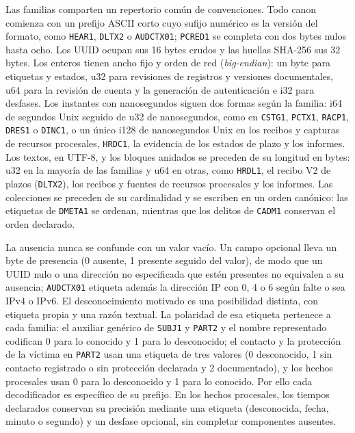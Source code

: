Las familias comparten un repertorio común de convenciones. Todo canon comienza con un prefijo ASCII corto cuyo sufijo numérico es la versión del formato, como \texttt{HEAR1}, \texttt{DLTX2} o \texttt{AUDCTX01}; \texttt{PCRED1} se completa con dos bytes nulos hasta ocho. Los UUID ocupan sus 16 bytes crudos y las huellas SHA-256 sus 32 bytes. Los enteros tienen ancho fijo y orden de red (\emph{big-endian}): un byte para etiquetas y estados, u32 para revisiones de registros y versiones documentales, u64 para la revisión de cuenta y la generación de autenticación e i32 para desfases. Los instantes con nanosegundos siguen dos formas según la familia: i64 de segundos Unix seguido de u32 de nanosegundos, como en \texttt{CSTG1}, \texttt{PCTX1}, \texttt{RACP1}, \texttt{DRES1} o \texttt{DINC1}, o un único i128 de nanosegundos Unix en los recibos y capturas de recursos procesales, \texttt{HRDC1}, la evidencia de los estados de plazo y los informes. Los textos, en UTF-8, y los bloques anidados se preceden de su longitud en bytes: u32 en la mayoría de las familias y u64 en otras, como \texttt{HRDL1}, el recibo V2 de plazos (\texttt{DLTX2}), los recibos y fuentes de recursos procesales y los informes. Las colecciones se preceden de su cardinalidad y se escriben en un orden canónico: las etiquetas de \texttt{DMETA1} se ordenan, mientras que los delitos de \texttt{CADM1} conservan el orden declarado.

La ausencia nunca se confunde con un valor vacío. Un campo opcional lleva un byte de presencia (0 ausente, 1 presente seguido del valor), de modo que un UUID nulo o una dirección no especificada que estén presentes no equivalen a su ausencia; \texttt{AUDCTX01} etiqueta además la dirección IP con 0, 4 o 6 según falte o sea IPv4 o IPv6. El desconocimiento motivado es una posibilidad distinta, con etiqueta propia y una razón textual. La polaridad de esa etiqueta pertenece a cada familia: el auxiliar genérico de \texttt{SUBJ1} y \texttt{PART2} y el nombre representado codifican 0 para lo conocido y 1 para lo desconocido; el contacto y la protección de la víctima en \texttt{PART2} usan una etiqueta de tres valores (0 desconocido, 1 sin contacto registrado o sin protección declarada y 2 documentado), y los hechos procesales usan 0 para lo desconocido y 1 para lo conocido. Por ello cada decodificador es específico de su prefijo. En los hechos procesales, los tiempos declarados conservan su precisión mediante una etiqueta (desconocida, fecha, minuto o segundo) y un desfase opcional, sin completar componentes ausentes.

